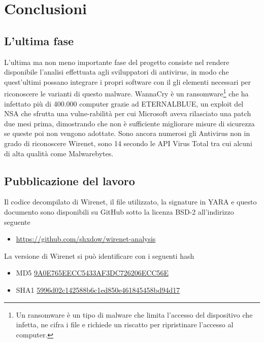\documentclass[12pt,oneside]{fithesis2}
\begin{document}

    \chapter*{Conclusioni}
        \section*{L'ultima fase}
        L'ultima ma non meno importante fase del progetto consiste nel rendere disponibile l'analisi effettuata agli sviluppatori di antivirus, in modo che quest'ultimi possano integrare i propri software con il gli elementi necessari per riconoscere le varianti di questo malware. WannaCry è un ransomware\footnote{Un ransomware è un tipo di malware che limita l'accesso del dispositivo che infetta, ne cifra i file e richiede un riscatto per ripristinare l'accesso al computer.} che ha infettato più di 400.000 computer grazie ad ETERNALBLUE, un exploit del NSA che sfrutta una vulne-\newline rabilità per cui Microsoft aveva rilasciato una patch due mesi prima, dimostrando che non è sufficiente migliorare misure di sicurezza se queste poi non vengono adottate. Sono ancora numerosi gli Antivirus non in grado di riconoscere Wirenet, sono 14 secondo le API Virus Total tra cui alcuni di alta qualità come Malwarebytes.
        \section*{Pubblicazione del lavoro}
        Il codice decompilato di Wirenet, il file utilizzato, la signature in YARA e questo documento sono disponibili su GitHub sotto la licenza BSD-2 all'indirizzo seguente
        \begin{itemize}
            \vspace{-1.25em}
            \item \url{https://github.com/shxdow/wirenet-analysis} 
        \end{itemize}
        \vspace{-1.25em}
        La versione di Wirenet si può identificare con i seguenti hash
        \begin{itemize}
            \vspace{-1.25em}
            \item MD5 \url{9A0E765EECC5433AF3DC726206ECC56E}
            \item SHA1 \url{5996d02c142588b6c1ed850e461845458bd94d17}
        \end{itemize}
        
\end{document}
